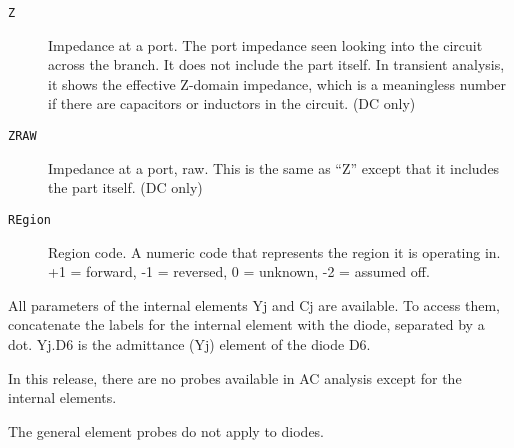 \begin{description}
\item[{\tt Z}] Impedance at a port.  The port impedance seen looking
  into the circuit across the branch.  It does not include the part
  itself.  In transient analysis, it shows the effective Z-domain
  impedance, which is a meaningless number if there are capacitors or
  inductors in the circuit.  (DC only)
  
\item[{\tt ZRAW}] Impedance at a port, raw.  This is the same as ``Z''
  except that it includes the part itself. (DC only)
  
\item[{\tt REgion}] Region code.  A numeric code that represents the
  region it is operating in.  +1 = forward, -1 = reversed, 0 =
  unknown, -2 = assumed off.

\end{description}

All parameters of the internal elements Yj and Cj are available.  To
access them, concatenate the labels for the internal element with the
diode, separated by a dot.  Yj.D6 is the admittance (Yj) element of
the diode D6.

In this release, there are no probes available in AC analysis except
for the internal elements.

The general element probes do not apply to diodes.
